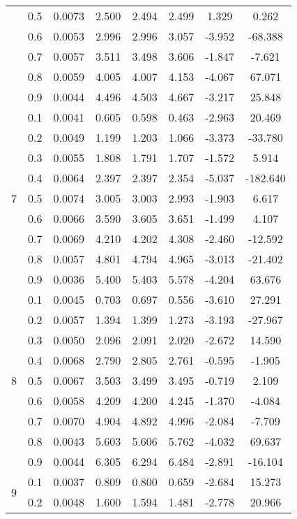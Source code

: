 \documentclass[11pt,a4paper]{report}
\begin{document}
\begin{longtable}{ | c | c || c | c | c | c | c | c | }
 & 0.5 & 0.0073 & 2.500 & 2.494 & 2.499 & 1.329 & 0.262 \\
 & 0.6 & 0.0053 & 2.996 & 2.996 & 3.057 & -3.952 & -68.388 \\
 & 0.7 & 0.0057 & 3.511 & 3.498 & 3.606 & -1.847 & -7.621 \\
 & 0.8 & 0.0059 & 4.005 & 4.007 & 4.153 & -4.067 & 67.071 \\
 & 0.9 & 0.0044 & 4.496 & 4.503 & 4.667 & -3.217 & 25.848 \\
 \hline
\multirow{9}{*}{7} & 0.1 & 0.0041 & 0.605 & 0.598 & 0.463 & -2.963 & 20.469 \\
 & 0.2 & 0.0049 & 1.199 & 1.203 & 1.066 & -3.373 & -33.780 \\
 & 0.3 & 0.0055 & 1.808 & 1.791 & 1.707 & -1.572 & 5.914 \\
 & 0.4 & 0.0064 & 2.397 & 2.397 & 2.354 & -5.037 & -182.640 \\
 & 0.5 & 0.0074 & 3.005 & 3.003 & 2.993 & -1.903 & 6.617 \\
 & 0.6 & 0.0066 & 3.590 & 3.605 & 3.651 & -1.499 & 4.107 \\
 & 0.7 & 0.0069 & 4.210 & 4.202 & 4.308 & -2.460 & -12.592 \\
 & 0.8 & 0.0057 & 4.801 & 4.794 & 4.965 & -3.013 & -21.402 \\
 & 0.9 & 0.0036 & 5.400 & 5.403 & 5.578 & -4.204 & 63.676 \\
 \hline
\multirow{9}{*}{8} & 0.1 & 0.0045 & 0.703 & 0.697 & 0.556 & -3.610 & 27.291 \\
 & 0.2 & 0.0057 & 1.394 & 1.399 & 1.273 & -3.193 & -27.967 \\
 & 0.3 & 0.0050 & 2.096 & 2.091 & 2.020 & -2.672 & 14.590 \\
 & 0.4 & 0.0068 & 2.790 & 2.805 & 2.761 & -0.595 & -1.905 \\
 & 0.5 & 0.0067 & 3.503 & 3.499 & 3.495 & -0.719 & 2.109 \\
 & 0.6 & 0.0058 & 4.209 & 4.200 & 4.245 & -1.370 & -4.084 \\
 & 0.7 & 0.0070 & 4.904 & 4.892 & 4.996 & -2.084 & -7.709 \\
 & 0.8 & 0.0043 & 5.603 & 5.606 & 5.762 & -4.032 & 69.637 \\
 & 0.9 & 0.0044 & 6.305 & 6.294 & 6.484 & -2.891 & -16.104 \\
 \hline
\multirow{9}{*}{9} & 0.1 & 0.0037 & 0.809 & 0.800 & 0.659 & -2.684 & 15.273 \\
 & 0.2 & 0.0048 & 1.600 & 1.594 & 1.481 & -2.778 & 20.966 \\

\end{longtable}
\end{document}
